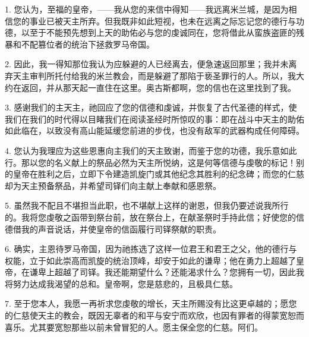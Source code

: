 1. 您认为，至福的皇帝，——我从您的来信中得知——我远离米兰城，是因为相信您的事业已被天主所弃。但我既非如此短视，也未在远离之际忘记您的德行与功德，以至于不能预先想到上天的助佑必与您的虔诚同在，您将借此从蛮族盗匪的残暴和不配篡位者的统治下拯救罗马帝国。\par

2. 因此，我一得知那位我认为应躲避的人已经离去，便急速返回那里；我并未离弃天主审判所托付给我的米兰教会，而是躲避了那陷于亵圣罪行的人。所以，我大约在返回，并从那天起一直住在这里。奥古斯都啊，您的信也在这里找到了我。\par

3. 感谢我们的主天主，祂回应了您的信德和虔诚，并恢复了古代圣德的样式，使我们在我们的时代得以目睹我们在阅读圣经时所惊叹的事：即在战斗中天主的助佑如此临在，以致没有高山能延缓您前进的步伐，也没有敌军的武器构成任何障碍。\par

4. 您认为我理应为这些恩惠向主我们的天主致谢，而鉴于您的功德，我乐意如此行。那以您的名义献上的祭品必然为天主所悦纳，这是何等信德与虔敬的标记！别的皇帝在胜利之后，立即下令建造凯旋门或其他纪念其胜利的纪念碑；而您的仁慈却为天主预备祭品，并希望司铎们向主献上奉献和感恩祭。\par

5. 虽然我不配且不堪担当此职，也不堪献上这样的谢恩，但我仍要述说我所行的。我将您虔敬之函带到祭台前，放在祭台上，在献圣祭时手持此信；好使您的信德借我的声音说话，并使皇帝的信函履行司铎祭献的职责。\par

6. 确实，主恩待罗马帝国，因为祂拣选了这样一位君王和君王之父，他的德行与权能，立于如此崇高而凯旋的统治顶峰，却安于如此的谦卑；他在勇力上超越了皇帝，在谦卑上超越了司铎。我还能期望什么？还能渴求什么？您拥有一切，因此我将努力达成我渴望的总和。皇帝啊，您是慈悲的，且极具仁慈。\par

7. 至于您本人，我愿一再祈求您虔敬的增长，天主所赐没有比这更卓越的；愿您的仁慈使天主的教会，既因无辜者的和平与安宁而欢欣，也因有罪者的得蒙宽恕而喜乐。尤其要宽恕那些以前未曾冒犯的人。愿主保全您的仁慈。阿们。\par



